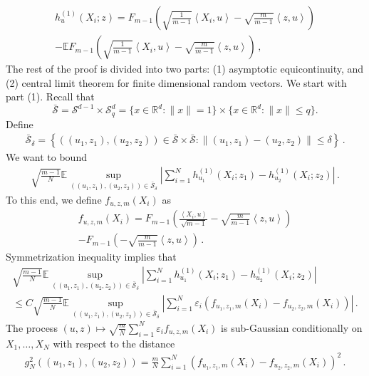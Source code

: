 \documentclass[12pt]{article}
\def\l{\left}
\def\r{\right}
\newcommand{\mb}{\mathbb}
\newcommand{\dotp}[2]{\left\langle#1,#2\right\rangle}
\theoremstyle{thmstyletwo}%
\theoremstyle{thmstylethree}%
\begin{document}
\begin{multline}
\label{eq:Phi_uz}
    h^{(1)}_{u}(X_i;z) = F_{m-1}\left(\sqrt{\frac{1}{m-1}}\dotp{X_i}{u} - \sqrt{\frac{m}{m-1}}\dotp{z}{u}\right) \\
    - \mb E F_{m-1}\left(\sqrt{\frac{1}{m-1}}\dotp{X_i}{u} - \sqrt{\frac{m}{m-1}}\dotp{z}{u}\right)\,,
\end{multline}
The rest of the proof is divided into two parts: (1) asymptotic equicontinuity, and (2) central limit theorem for finite dimensional random vectors. We start with part (1). Recall that 
\[
\bar{\mathcal{S}} = \mathcal{S}^{d-1} \times \mathcal{S}^d_q = \{x \in \mb R^d : \|x\| = 1\} \times \{x \in \mb R^d: \|x\| \leq q\}.
\]
Define
\begin{align}
\label{eq:bar-S-delta}
    \bar{\mathcal{S}}_\delta = \l\{((u_1,z_1), (u_2,z_2)) \in \bar{\mathcal{S}} \times \bar{\mathcal{S}} : \|(u_1, z_1) - (u_2, z_2)\| \leq \delta\r\}\,.
\end{align}
We want to bound
\begin{align*}
    \sqrt{\frac{m-1}{N}} \mb E \sup_{((u_1,z_1), (u_2,z_2)) \in \bar{\mathcal{S}}_\delta} \l\lvert  \sum_{i=1}^N h^{(1)}_{u_1}(X_i; z_1) - h^{(1)}_{u_2}(X_i; z_2)\r\rvert\,.
\end{align*}
To this end, we define $f_{u, z, m}(X_i)$ as
\begin{multline}\label{eq:f-function}
    f_{u,z,m}(X_i) = F_{m-1}\l( \frac{\dotp{X_i}{u}}{\sqrt{m-1}} - \sqrt{\frac{m}{m-1}}\dotp{z}{u}\r) \\
    - F_{m-1}\l(  - \sqrt{\frac{m}{m-1}}\dotp{z}{u}\r)\,.
\end{multline}
Symmetrization inequality implies that 
\begin{multline*}
    \sqrt{\frac{m-1}{N}} \mb E \sup_{((u_1,z_1), (u_2,z_2)) \in \bar{\mathcal{S}}_\delta} \l\lvert  \sum_{i=1}^N h^{(1)}_{u_1}(X_i; z_1) - h^{(1)}_{u_2}(X_i; z_2)\r\rvert \\
    \leq C\sqrt{\frac{m-1}{N}} \mb E \sup_{((u_1,z_1), (u_2,z_2)) \in \bar{\mathcal{S}}_\delta} \l\lvert \sum_{i=1}^N \varepsilon_i \l(f_{u_1,z_1,m}(X_i) - f_{u_2,z_2,m}(X_i)\r)\r\rvert \,.
\end{multline*}
The process $(u,z) \mapsto \sqrt{\frac{m}{N}}\sum_{i=1}^N \varepsilon_i f_{u,z,m}(X_i)$ is sub-Gaussian conditionally on $X_1, \ldots, X_N$ with respect to the distance
\begin{align*}
    g^2_N \l((u_1, z_1), (u_2, z_2)\r) = \frac{m}{N} \sum_{i=1}^N \l(f_{u_1,z_1,m}(X_i)- f_{u_2,z_2,m}(X_i)\r)^2\,.
\end{align*}
\end{document}
